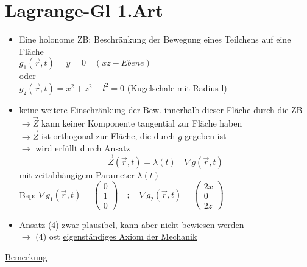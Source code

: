 \documentclass[titlepage,12pt,a4paper,ngerman]{report}
\begin{document}
\section{Lagrange-Gl 1.Art}
\begin{itemize}
	\item Eine holonome ZB: Beschränkung der Bewegung eines Teilchens auf eine Fläche\\
	$ g_1(\vec{r},t) = y = 0  \quad (xz-Ebene)$\\
	oder\\
	$ g_2(\vec{r},t) = x^2 + z^2 - l^2 = 0 $ (Kugelschale mit Radius l)
	\item \underline{keine weitere Einschränkung} der Bew. innerhalb dieser Fläche durch die ZB\\
	$ \rightarrow \vec{Z} $ kann keiner Komponente tangential zur Fläche haben\\
	$ \rightarrow \vec{Z} $ ist orthogonal zur Fläche, die durch $g$ gegeben ist\\
	$ \rightarrow $ wird erfüllt durch Ansatz\\
	\begin{equation*}
	\vec{Z}(\vec{r},t) = \lambda(t) \quad \nabla g(\vec{r},t) \tag{4}
	\end{equation*}
	mit zeitabhängigem Parameter $ \lambda(t) $\\
	Bsp: $ \nabla g_1(\vec{r},t) = \begin{pmatrix}
	0\\1\\0
	\end{pmatrix} \quad ; \quad \nabla g_2(\vec{r},t) = \begin{pmatrix}
	2x\\0\\2z
	\end{pmatrix} $
	\item Ansatz (4) zwar plausibel, kann aber nicht bewiesen werden\\
	$ \rightarrow $ (4) ost \underline{eigenständiges Axiom der Mechanik}
\end{itemize}
\underline{Bemerkung}\\
\end{document}
